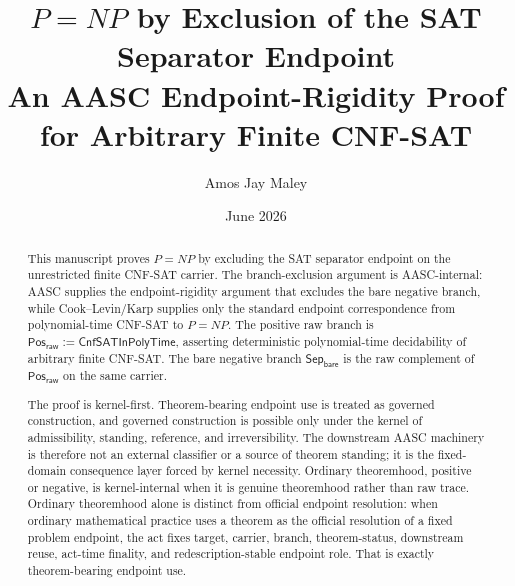\documentclass[11pt]{article}
\title{
\(P=NP\) by Exclusion of the SAT Separator Endpoint\\[0.5em]
{\normalsize An AASC Endpoint-Rigidity Proof for Arbitrary Finite CNF-SAT}
}
\author{Amos Jay Maley}
\date{June 2026}
\theoremstyle{definition}
\theoremstyle{remark}
\newcommand{\PosRaw}{\mathsf{Pos}_{\mathsf{raw}}}
\newcommand{\SepBare}{\mathsf{Sep}_{\mathsf{bare}}}
\newcommand{\CnfSATP}{\mathsf{CnfSATInPolyTime}}
\begin{document}
\maketitle

\begin{abstract}
This manuscript proves \(P=NP\) by excluding the SAT separator endpoint on the unrestricted finite CNF-SAT carrier. The branch-exclusion argument is AASC-internal: AASC supplies the endpoint-rigidity argument that excludes the bare negative branch, while Cook--Levin/Karp supplies only the standard endpoint correspondence from polynomial-time CNF-SAT to \(P=NP\). The positive raw branch is \(\PosRaw := \CnfSATP\), asserting deterministic polynomial-time decidability of arbitrary finite CNF-SAT. The bare negative branch \(\SepBare\) is the raw complement of \(\PosRaw\) on the same carrier.

The proof is kernel-first. Theorem-bearing endpoint use is treated as governed construction, and governed construction is possible only under the kernel of admissibility, standing, reference, and irreversibility. The downstream AASC machinery is therefore not an external classifier or a source of theorem standing; it is the fixed-domain consequence layer forced by kernel necessity. Ordinary theoremhood, positive or negative, is kernel-internal when it is genuine theoremhood rather than raw trace. Ordinary theoremhood alone is distinct from official endpoint resolution: when ordinary mathematical practice uses a theorem as the official resolution of a fixed problem endpoint, the act fixes target, carrier, branch, theorem-status, downstream reuse, act-time finality, and redescription-stable endpoint role. That is exactly theorem-bearing endpoint use.


\end{abstract}
\end{document}
